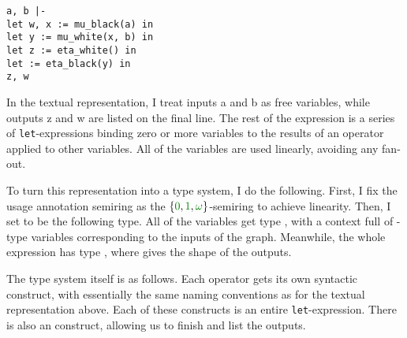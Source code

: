 \noindent
\begin{minipage}[t]{0.5\textwidth}
\end{minipage}
\begin{minipage}[t]{0.5\textwidth}
  \vspace{1.5em}
\begin{verbatim}
a, b |-
let w, x := mu_black(a) in
let y := mu_white(x, b) in
let z := eta_white() in
let := eta_black(y) in
z, w
\end{verbatim}
\end{minipage}

In the textual representation, I treat inputs a and b as free variables, while
outputs z and w are listed on the final line.
The rest of the expression is a series of \texttt{let}-expressions binding zero
or more variables to the results of an operator applied to other variables.
All of the variables are used linearly, avoiding any fan-out.

To turn this representation into a type system, I do the following.
First, I fix the usage annotation semiring as the
$\{\gr0, \gr1, \gr\omega\}$-semiring to achieve linearity.
Then, I set  to be the following type.
All of the variables get type , with a context
full of -type variables corresponding to the
inputs of the graph.
Meanwhile, the whole expression has type
\AgdaSpace{}, where 
gives the shape of the outputs.


The type system itself is as follows.
Each operator gets its own syntactic construct, with essentially the same naming
conventions as for the textual representation above.
Each of these constructs is an entire \texttt{let}-expression.
There is also an  construct, allowing us to
finish and list the outputs.

